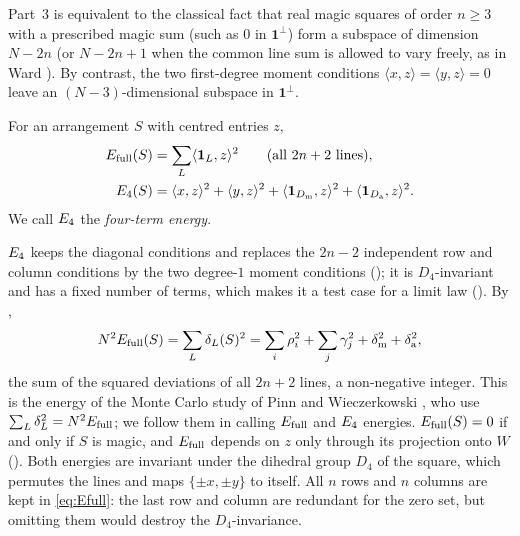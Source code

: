 Part~3 is equivalent to the classical fact that real magic squares of order $n\ge3$ with a prescribed magic sum (such as $0$ in $\mathbf 1^\perp$) form a subspace of dimension $N-2n$ (or $N-2n+1$ when the common line sum is allowed to vary freely, as in Ward \cite{ward1980vector}). By contrast, the two first-degree moment conditions $\langle x,z\rangle=\langle y,z\rangle=0$ leave an $(N-3)$-dimensional subspace in $\mathbf 1^\perp$.

\begin{definition}[Energies]
\label{def:energies}
For an arrangement $S$ with centred entries $z$,
\begin{align}
E_{\mathrm{full}}(S)&=\sum_{L}\langle\mathbf 1_L,z\rangle^{2}\qquad\text{(all $2n+2$ lines)},\label{eq:Efull}\\
E_4(S)&=\langle x,z\rangle^{2}+\langle y,z\rangle^{2}+\langle\mathbf 1_{D_{\mathrm m}},z\rangle^{2}+\langle\mathbf 1_{D_{\mathrm a}},z\rangle^{2}.\label{eq:Elow}
\end{align}
We call $E_4$ the \emph{four-term energy}.
\end{definition}

$E_4$ keeps the diagonal conditions and replaces the $2n-2$ independent row and column conditions by the two degree-$1$ moment conditions (); it is $D_4$-invariant and has a fixed number of terms, which makes it a test case for a limit law ().
By ,
\begin{equation}
N^{2}E_{\mathrm{full}}(S)=\sum_{L}\delta_L(S)^{2}=\sum_i\rho_i^{2}+\sum_j\gamma_j^{2}+\delta_{\mathrm m}^{2}+\delta_{\mathrm a}^{2},
\label{eq:Efull_devs}
\end{equation}
the sum of the squared deviations of all $2n+2$ lines, a non-negative integer.
This is the energy of the Monte Carlo study of Pinn and Wieczerkowski \cite{pinn1998number}, who use $\sum_L\delta_L^2=N^2E_{\mathrm{full}}$; we follow them in calling $E_{\mathrm{full}}$ and $E_4$ energies.
$E_{\mathrm{full}}(S)=0$ if and only if $S$ is magic, and $E_{\mathrm{full}}$ depends on $z$ only through its projection onto $W$ ().
Both energies are invariant under the dihedral group $D_4$ of the square, which permutes the lines and maps $\{\pm x,\pm y\}$ to itself.
All $n$ rows and $n$ columns are kept in \eqref{eq:Efull}: the last row and column are redundant for the zero set, but omitting them would destroy the $D_4$-invariance.

